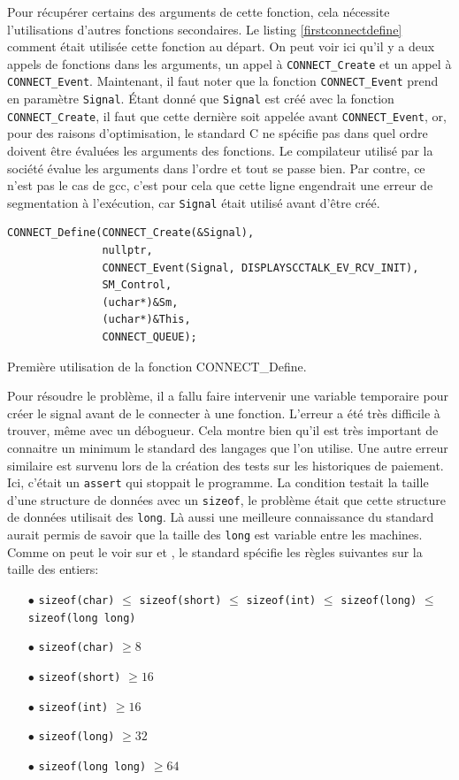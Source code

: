 \documentclass[a4paper]{article}
\begin{document}
Pour récupérer certains des arguments de cette fonction, cela nécessite 
l'utilisations d'autres fonctions secondaires. Le listing
\ref{firstconnectdefine} comment était utilisée cette fonction au départ. On
peut voir ici qu'il y a deux appels de fonctions dans les arguments, un appel à
\verb|CONNECT_Create| et un appel à \verb|CONNECT_Event|. Maintenant, il faut
noter que la fonction \verb|CONNECT_Event| prend en paramètre \verb|Signal|.
Étant donné que \verb|Signal| est créé avec la fonction \verb|CONNECT_Create|,
il faut que cette dernière soit appelée avant \verb|CONNECT_Event|, or, pour
des raisons d'optimisation, le standard C ne spécifie pas dans quel ordre
doivent être évaluées les arguments des fonctions. Le compilateur utilisé par la
société évalue les arguments dans l'ordre et tout se passe bien. Par contre, ce
n'est pas le cas de gcc, c'est pour cela que cette ligne engendrait une erreur
de segmentation à l'exécution, car \verb|Signal| était utilisé avant d'être
créé.

\begin{listing}[ht!]
\begin{verbatim}
CONNECT_Define(CONNECT_Create(&Signal),
               nullptr,
               CONNECT_Event(Signal, DISPLAYSCCTALK_EV_RCV_INIT),
               SM_Control,
               (uchar*)&Sm,
               (uchar*)&This,
               CONNECT_QUEUE);
\end{verbatim}
\caption{Première utilisation de la fonction CONNECT\_Define.}
\label{firstconnectdefine}
\end{listing}

Pour résoudre le problème, il a fallu faire intervenir une variable temporaire
pour créer le signal avant de le connecter à une fonction. L'erreur a été très
difficile à trouver, même avec un débogueur. Cela montre bien qu'il est très
important de connaitre un minimum le standard des langages que l'on utilise. Une
autre erreur similaire est survenu lors de la création des tests sur les
historiques de paiement. Ici, c'était un \verb|assert| qui stoppait le
programme. La condition testait la taille d'une structure de données avec un
\verb|sizeof|, le problème était que cette structure de données utilisait des
\verb|long|. Là aussi une meilleure connaissance du standard aurait permis de
savoir que la taille des \verb|long| est variable entre les machines. Comme on
peut le voir sur \cite{ISO:C99} et \cite{typescppref}, le standard spécifie les
règles suivantes sur la taille des entiers:

\begin{itemize}
  \item[$\bullet$] \verb|sizeof(char)| $\leq$ \verb|sizeof(short)| $\leq$ \verb|sizeof(int)| $\leq$ \verb|sizeof(long)| $\leq$ \verb|sizeof(long long)|
  \item[$\bullet$] \verb|sizeof(char)| $\geq 8$
  \item[$\bullet$] \verb|sizeof(short)| $\geq 16$
  \item[$\bullet$] \verb|sizeof(int)| $\geq 16$
  \item[$\bullet$] \verb|sizeof(long)| $\geq 32$
  \item[$\bullet$] \verb|sizeof(long long)| $\geq 64$
\end{itemize}
\end{document}
